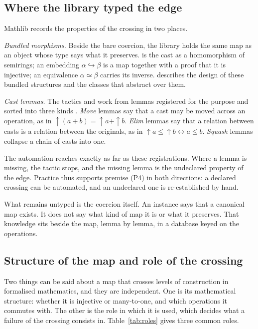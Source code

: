 \subsection{Where the library typed the edge}

Mathlib \citep{mathlib2020} records the properties of the crossing in two places.

\emph{Bundled morphisms.} Beside the bare coercion, the library holds the same map as an
object whose type says what it preserves.  is the cast as a
homomorphism of semirings; an embedding $\alpha \hookrightarrow \beta$ is a map together
with a proof that it is injective; an equivalence $\alpha \simeq \beta$ carries its
inverse. \citet{baanen2022} describes the design of these bundled structures and the
classes that abstract over them.

\emph{Cast lemmas.} The tactics  and  work from lemmas
registered for the purpose and sorted into three kinds \citep{lewis2020}. \emph{Move}
lemmas say that a cast may be moved across an operation, as in
${\uparrow}(a + b) = {\uparrow}a + {\uparrow}b$. \emph{Elim} lemmas say that a relation
between casts is a relation between the originals, as in
${\uparrow}a \le {\uparrow}b \leftrightarrow a \le b$. \emph{Squash} lemmas collapse a
chain of casts into one.

The automation reaches exactly as far as these registrations. Where a lemma is missing,
the tactic stops, and the missing lemma is the undeclared property of the edge. Practice
thus supports premise (P4) in both directions: a declared crossing can be automated, and
an undeclared one is re-established by hand.

What remains untyped is the coercion itself. An instance  says
that a canonical map exists. It does not say what kind of map it is or what it preserves.
That knowledge sits beside the map, lemma by lemma, in a database keyed on the
operations.

\subsection{Structure of the map and role of the crossing}
\label{sec:three-kinds}

Two things can be said about a map that crosses levels of construction in formalised
mathematics, and they are independent. One is its mathematical structure: whether it is
injective or many-to-one, and which operations it commutes with. The other is the role
in which it is used, which decides what a failure of the crossing consists in.
Table~\ref{tab:roles} gives three common roles.

